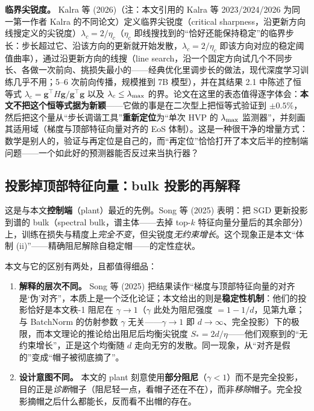 \textbf{临界尖锐度。} Kalra 等 (2026)（注：本文引用的 Kalra 等
2023/2024/2026 为同一第一作者 Kalra 的不同论文）定义临界尖锐度（critical sharpness，沿更新方向线搜定义的尖锐度）$\lambda_c =
2/\eta_c$（$\eta_c$ 即线搜找到的``恰好还能保持稳定''的临界步长：步长超过它、沿该方向的更新就开始发散，$\lambda_c=2/\eta_c$ 即该方向对应的稳定阈值曲率），通过沿更新方向的线搜（line search，沿一个固定方向试几个不同步长、各做一次前向、挑损失最小的——经典优化里调步长的做法，现代深度学习训练几乎不用；5--6 次前向传播，规模推到 7B 模型），并在其结果 2.1
中陈述了恒等式 $\lambda_c =
\mathbf{g}^{\top}H\mathbf{g}/\mathbf{g}^{\top}\mathbf{g}$ 以及 $\lambda_c \le \lambda_{\max}$
的界。论文在这里的表态值得逐字体会：\textbf{本文不把这个恒等式据为新颖}——它做的事是在二次型上把恒等式验证到
$\pm0.5\%$，然后把这个量从“步长调谐工具”\textbf{重新定位}为“单次 HVP 的 $\lambda_{\max}$
监测器”，并刻画其适用域（梯度与顶部特征向量对齐的 EoS
体制）。这是一种很干净的增量方式：数学是别人的，验证与再定位是自己的，而“再定位”恰恰打开了本文后半的控制端问题——一个如此好的预测器能否反过来当执行器？

\subsection{投影掉顶部特征向量：bulk 投影的再解释}
\label{sec:ch02-bulk}

这是与本文\textbf{控制端}（plant）最近的先例。Song 等 (2025) 表明：把 SGD
更新投影到谱的 bulk（spectral bulk，谱主体——去掉 top-$k$
特征向量分量后的其余部分）上，训练在损失与精度上\emph{完全不变}，但尖锐度\emph{无约束增长}。这个现象正是本文“体制
(ii)”——精确阻尼解除自稳定帽——的定性症状。

本文与它的区别有两处，且都值得细品：

\begin{enumerate}
  \item \textbf{解释的层次不同。} Song 等 (2025)
 把结果读作“梯度与顶部特征向量的对齐是‘伪’对齐”，本质上是一个泛化论证；本文给出的则是\textbf{稳定性机制}：他们的投影恰好是本文秩-1
 阻尼在 $\gamma\!\to\!1$（$\gamma$ 此处为阻尼强度 $=1-1/d$，见第九章；与 BatchNorm 的仿射参数 $\gamma$ 无关——$\gamma\to1$ 即 $d\to\infty$、完全投影）下的极限，而本文理论的推论给出阻尼后均衡尖锐度 $S_{*} =
2d/\eta$——他们观察到的“无约束增长”，正是这个均衡随 $d$
 走向无穷的发散。同一现象，从“对齐是假的”变成“帽子被彻底摘了”。
  \item \textbf{设计意图不同。} 本文的 plant
刻意使用\textbf{部分阻尼}（$\gamma<1$）而不是完全投影，目的正是\emph{诊断}帽子（阻尼轻一点，看帽子还在不在），而非\emph{移除}帽子。完全投影摘帽之后什么都能长，反而看不出帽的存在。
\end{enumerate}

